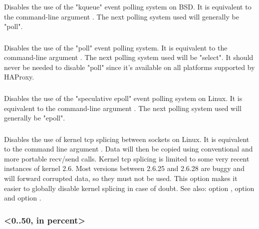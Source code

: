 \subsubsection[nokqueue]{}

Disables the use of the "kqueue" event polling system on BSD. It is
equivalent to the command-line argument . The next polling system
used will generally be "poll".


\subsubsection[nopoll]{}

Disables the use of the "poll" event polling system. It is equivalent to the
command-line argument . The next polling system used will be "select".
It should never be needed to disable "poll" since it's available on all
platforms supported by HAProxy.


\subsubsection[nosepoll]{}

Disables the use of the "speculative epoll" event polling system on Linux. It
is equivalent to the command-line argument . The next polling system
used will generally be "epoll".


\subsubsection[nosplice]{}

Disables the use of kernel tcp splicing between sockets on Linux. It is
equivalent to the command line argument .  Data will then be copied
using conventional and more portable recv/send calls. Kernel tcp splicing is
limited to some very recent instances of kernel 2.6. Most versions between
2.6.25 and 2.6.28 are buggy and will forward corrupted data, so they must not
be used. This option makes it easier to globally disable kernel splicing in
case of doubt.
See also: option , option  and
option .

\subsubsection[spread-checks]{ <0..50, in percent>}

